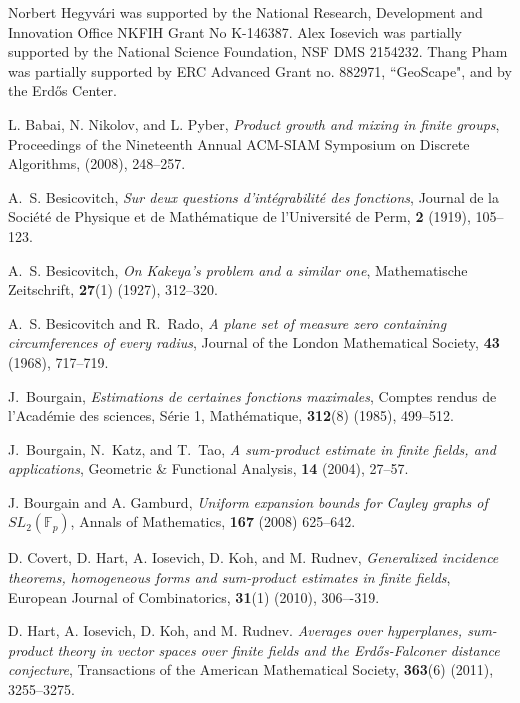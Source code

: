 \documentclass[11pt]{article}
\def\Fbb{\mathbb{F}}
\def\SL{SL}
\begin{document}
Norbert Hegyv\'{a}ri was supported by the National Research, Development and Innovation Office NKFIH Grant No K-146387. Alex Iosevich was partially supported by the National Science Foundation,  NSF DMS 2154232. Thang Pham was partially supported by ERC Advanced Grant no. 882971, ``GeoScape", and by the Erd\H{o}s Center.
\begin{thebibliography}{}

 L. Babai, N. Nikolov, and L. Pyber, \textit{Product growth and mixing in finite groups}, Proceedings of the Nineteenth Annual ACM-SIAM Symposium on Discrete Algorithms, (2008), 248--257.

  A.~S. Besicovitch, {\em {Sur deux questions d'int{\'e}grabilit{\'e} des fonctions}}, Journal de la Soci{\'e}t{\'e} de Physique et de Math{\'e}matique de l’Universit{\'e} de Perm, {\bf 2} (1919), 105--123.

A.~S. Besicovitch, {\em On {K}akeya's problem and a similar one}, Mathematische Zeitschrift, {\bf 27}(1) (1927), 312--320.

  A.~S. Besicovitch and R.~Rado, {\em A plane set of measure zero containing circumferences of every radius}, Journal of the London Mathematical Society, {\bf 43} (1968), 717--719.


  J.~Bourgain, {\em Estimations de certaines fonctions maximales}, Comptes rendus de l'Académie des sciences, S\'{e}rie 1, Math\'{e}matique, \textbf{312}(8) (1985), 499--512.


 J.~Bourgain, N.~Katz, and T.~Tao, {\it A sum-product estimate in finite fields, and applications}, Geometric \& Functional Analysis, {\bf 14} (2004), 27--57.

 J. Bourgain and A. Gamburd, \textit{Uniform expansion bounds for Cayley graphs of $\SL_2(\Fbb_p)$}, Annals of Mathematics, \textbf{167} (2008) 625--642.


 D. Covert, D. Hart, A. Iosevich, D. Koh, and M. Rudnev, {\it Generalized incidence theorems, homogeneous forms and sum-product estimates in finite fields}, European Journal of Combinatorics, {\bf 31}(1) (2010), 306–-319.

D. Hart, A. Iosevich, D. Koh, and M. Rudnev. {\it Averages over hyperplanes, sum-product theory in vector spaces over finite fields and the Erd\H{o}s-Falconer distance conjecture}, Transactions of the American Mathematical Society, \textbf{363}(6) (2011), 3255--3275.


\end{thebibliography}
\end{document}
